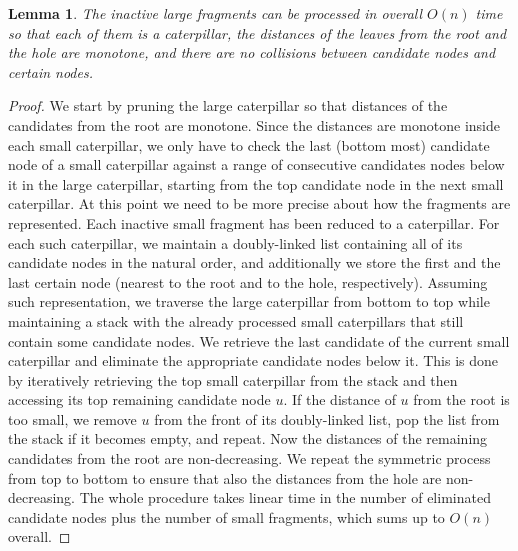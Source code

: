 \documentclass[11pt,a4paper]{article}
\newtheorem{lemma}{Lemma}
\theoremstyle{definition}
\theoremstyle{remark}
\begin{document}
\begin{lemma}\label{lemma3}
	The inactive large fragments can be processed in overall $O(n)$ time so that each of them is a caterpillar, the distances of the leaves from the root and the hole are monotone, and there are no collisions between candidate nodes and certain nodes.
\end{lemma}
\begin{proof}

We start by pruning the large caterpillar so that distances of the candidates from the root are
monotone. Since the distances are monotone inside each small caterpillar, we only have to check the last (bottom most) 
candidate node of a small caterpillar against a range of consecutive candidates nodes below it in the large
caterpillar, starting from the top candidate node in the next small caterpillar. 
At this point we need to be more precise about how the fragments are represented. Each inactive small
fragment has been reduced to a caterpillar. For each such caterpillar, we maintain a doubly-linked list containing
all of its candidate nodes in the natural order, and additionally we store the first and the last certain
node (nearest to the root and to the hole, respectively). Assuming such representation, we traverse
the large caterpillar from bottom to top while
maintaining a stack with the already processed small caterpillars that still contain some candidate nodes.
We retrieve the last candidate of the current small caterpillar and eliminate the appropriate candidate
nodes below it. This is done by iteratively retrieving the top small caterpillar from the stack and then
accessing its top remaining candidate node $u$. If the distance of $u$ from the root is too small, we
remove $u$ from the front of its doubly-linked list, pop the list from the stack if it becomes empty,
and repeat. Now the distances of the remaining candidates from the root are
non-decreasing. We repeat the symmetric process from top to bottom to ensure that also the distances
from the hole are non-decreasing. The whole procedure takes linear time in the number of eliminated
candidate nodes plus the number of small fragments, which sums up to $O(n)$ overall.


\end{proof}
\end{document}
